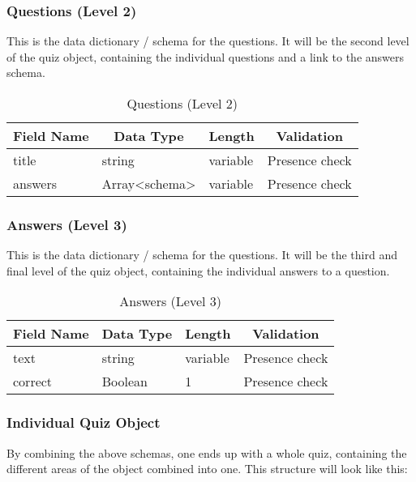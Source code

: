 \subsubsection{Questions (Level 2)}
This is the data dictionary / schema for the questions. It will be the second level of the quiz object, containing the individual questions and a link to the answers schema.

\begin{table}[]
\centering
\begin{tabular}{|l|l|l|l|}
\hline
\multicolumn{1}{|c|}{{\bf Field Name}} & \multicolumn{1}{c|}{{\bf Data Type}} & \multicolumn{1}{c|}{{\bf Length}} & \multicolumn{1}{c|}{{\bf Validation}} \\ \hline
title & string & variable & Presence check \\ \hline
answers & Array<schema> & variable & Presence check \\ \hline
\end{tabular}
\caption{Questions (Level 2)}
\end{table}

\subsubsection{Answers (Level 3)}
This is the data dictionary / schema for the questions. It will be the third and final level of the quiz object, containing the individual answers to a question.

\begin{table}[]
\centering
\begin{tabular}{|l|l|l|l|}
\hline
\multicolumn{1}{|c|}{{\bf Field Name}} & \multicolumn{1}{c|}{{\bf Data Type}} & \multicolumn{1}{c|}{{\bf Length}} & \multicolumn{1}{c|}{{\bf Validation}} \\ \hline
text & string & variable & Presence check \\ \hline
correct & Boolean & 1 & Presence check \\ \hline
\end{tabular}
\caption{Answers (Level 3)}
\end{table}


\subsubsection{Individual Quiz Object}
By combining the above schemas, one ends up with a whole quiz, containing the different areas of the object combined into one. This structure will look like this:

